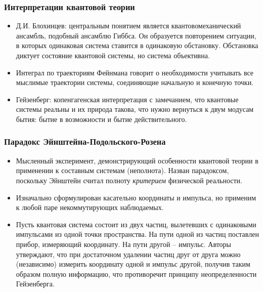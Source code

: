 \documentclass[10pt]{beamer}
\begin{document}
\begin{frame}[label=interpretations-3]%
  \frametitle{Интерпретации квантовой теории}

  \begin{itemize}
    \item Д.И. Блохинцев: центральным понятием является 
      квантовомеханический ансамбль, подобный ансамблю Гиббса. Он 
      образуется повторением ситуации, в которых одинаковая система 
      ставится в одинаковую обстановку. Обстановка диктует состояние 
      квантовой системы, но система объективна.

    \item Интеграл по траекториям Фейнмана говорит о необходимости 
      учитывать все мыслимые траектории системы, соединяющие начальную 
      и конечную точки.

    \item Гейзенберг: копенгагенская интерпретация с замечанием, что 
      квантовые системы реальны и их природа такова, что нужно вернуться 
      к двум модусам бытия: бытие в возможности и бытие действительного.
  \end{itemize}
\end{frame}%

\begin{frame}[label=EPR-paradox]%
  \frametitle{Парадокс Эйнштейна-Подольского-Розена}

  \begin{itemize}
    \item Мысленный эксперимент, демонстрирующий особенности квантовой 
      теории в применении к составным системам (неполнота). Назван 
      парадоксом, поскольку Эйнштейн считал полноту \textit{критерием} 
      физической реальности.

    \item Изначально сформулирован касательно координаты и импульса, но 
      применим к любой паре некоммутирующих наблюдаемых.

    \item Пусть квантовая система состоит из двух частиц, вылетевших 
      с одинаковыми импульсами из одной точки пространства. На пути 
      одной из частиц поставлен прибор, измеряющий координату. На пути 
      другой -- импульс. Авторы утверждают, что при достаточном удалении 
      частиц друг от друга можно (независимо) измерить координату одной 
      и импульс другой, получив таким образом полную информацию, что 
      противоречит принципу неопределенности Гейзенберга.
  \end{itemize}
\end{frame}%
\end{document}
